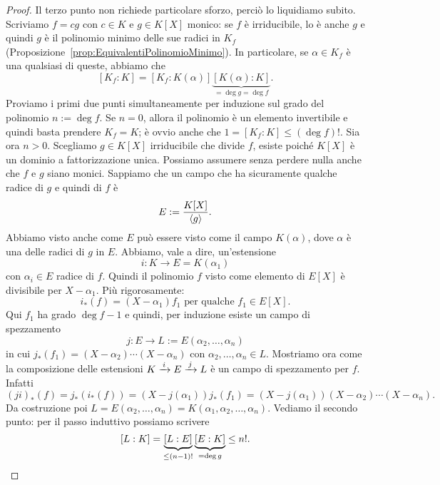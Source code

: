 \begin{proof}
Il terzo punto non richiede particolare sforzo, perciò lo liquidiamo subito. Scriviamo \(f = c g\) con \(c \in K\) e \(g \in K[X]\) monico: se \(f\) è irriducibile, lo è anche \(g\) e quindi \(g\) è il polinomio minimo delle sue radici in \(K_f\) (Proposizione~\ref{prop:EquivalentiPolinomioMinimo}). In particolare, se \(\alpha \in K_f\) è una qualsiasi di queste, abbiamo che
\[\left[K_f:K\right] = \left[K_f:K(\alpha)\right] \underbrace{[K(\alpha):K]}_{= \deg g = \deg f} .\]
Proviamo i primi due punti simultaneamente per induzione sul grado del polinomio \(n := \deg f\). Se \(n=0\), allora il polinomio è un elemento invertibile e quindi basta prendere \(K_f = K\); è ovvio anche che \(1 = \left[K_f:K\right] \le (\deg f)!\). Sia ora \(n>0\). Scegliamo \(g \in K[X]\) irriducibile che divide \(f\), esiste poiché \(K[X]\) è un dominio a fattorizzazione unica. Possiamo assumere senza perdere nulla anche che \(f\) e \(g\) siano monici. Sappiamo che un campo che ha sicuramente qualche radice di \(g\) e quindi di \(f\) è
\[E := \frac{K[X]}{\left\langle g\right\rangle} .\]
Abbiamo visto anche come \(E\) può essere visto come il campo \(K(\alpha)\), dove \(\alpha\) è una delle radici di \(g\) in \(E\). Abbiamo, vale a dire, un'estensione
\[ i : K \to E = K(\alpha_1) \]
con \(\alpha_i \in E\) radice di \(f\). Quindi il polinomio \(f\) visto come elemento di \(E[X]\) è divisibile per \(X-\alpha_1\). Più rigorosamente:
\[i_\ast(f) = (X-\alpha_1) f_1 \text{ per qualche } f_1 \in E[X] .\]
Qui \(f_1\) ha grado \(\deg f -1\) e quindi, per induzione esiste un campo di spezzamento
\[j : E \to L := E\left(\alpha_2, \dots{}, \alpha_n\right)\]
in cui \(j_\ast(f_1) = (X-\alpha_2) \cdots{} (X-\alpha_n)\) con \(\alpha_2, \dots{}, \alpha_n \in L\). Mostriamo ora come la composizione delle estensioni \(K \xrightarrow{\,i\,} E \xrightarrow{\,j\,} L\) è un campo di spezzamento per \(f\). Infatti
\[(ji)_\ast(f) = j_\ast\left( i_\ast(f) \right) = (X-j(\alpha_1)) j_\ast(f_1) = (X-j(\alpha_1))(X-\alpha_2) \cdots (X-\alpha_n) .\]
Da costruzione poi \(L = E\left(\alpha_2, \dots{}, \alpha_n\right) = K\left(\alpha_1, \alpha_2, \dots{}, \alpha_n\right)\). Vediamo il secondo punto: per il passo induttivo possiamo scrivere
\[[L : K] = \underbrace{[L : E]}_{\le (n-1)!} \underbrace{[E : K]}_{= \deg g} \le n! . \qedhere\]
\end{proof}

